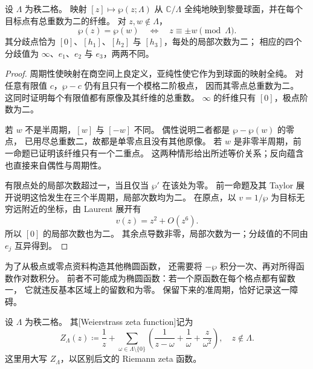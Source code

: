 \begin{proposition}[二重映射的纤维与分歧]\label{b3:prop:22-wp-fibers}
设 \(\Lambda\) 为秩二格。
映射 \([z]\mapsto\wp(z;\Lambda)\) 从 \(\mathbb C/\Lambda\)
全纯地映到黎曼球面，并在每个目标点有总重数为二的纤维。
对 \(z,w\notin\Lambda\)，
\[
 \wp(z)=\wp(w)
 \quad\Longleftrightarrow\quad z\equiv\pm w\pmod\Lambda.
\]
其分歧点恰为 \([0]\)、\([h_1]\)、\([h_2]\) 与 \([h_3]\)，每处的局部次数为二；
相应的四个分歧值为 \(\infty\)、\(e_1\)、\(e_2\) 与 \(e_3\)，两两不同。
\end{proposition}
\begin{proof}
周期性使映射在商空间上良定义，亚纯性使它作为到球面的映射全纯。
对任意有限值 \(c\)，\(\wp-c\) 仍有且只有一个模格二阶极点，
因而其零点总重数为二。
这同时证明每个有限值都有原像及其纤维的总重数。
\(\infty\) 的纤维只有 \([0]\)，极点阶数为二。

若 \(w\) 不是半周期，\([w]\) 与 \([-w]\) 不同。
偶性说明二者都是 \(\wp-\wp(w)\) 的零点，
已用尽总重数二，故都是单零点且没有其他原像。
若 \(w\) 是非零半周期，前一命题已证明该纤维只有一个二重点。
这两种情形给出所述等价关系；反向蕴含也直接来自偶性与周期性。

有限点处的局部次数超过一，当且仅当 \(\wp'\) 在该处为零。
前一命题及其 Taylor 展开说明这恰发生在三个半周期，局部次数均为二。
在原点，以 \(v=1/\wp\) 为目标无穷远附近的坐标，由 Laurent 展开有
\[
 v(z)=z^2+O(z^6).
\]
所以 \([0]\) 的局部次数也为二。
其余点导数非零，局部次数为一；分歧值的不同由 \(e_j\) 互异得到。
\end{proof}

为了从极点或零点资料构造其他椭圆函数，
还需要将 \(-\wp\) 积分一次、再对所得函数作对数积分。
前者不可能成为椭圆函数：若一个原函数在每个格点都有留数一，
它就违反基本区域上的留数和为零。
保留下来的准周期，恰好记录这一障碍。

\begin{definition}\label{b3:def:22-zeta}
设 \(\Lambda\) 为秩二格。
其[Weierstrass zeta function]记为
\[
 Z_\Lambda(z)\coloneqq\frac1z+
 \sum_{\omega\in\Lambda\setminus\{0\}}
 \left(\frac1{z-\omega}+\frac1\omega+\frac z{\omega^2}\right),
 \quad z\notin\Lambda.
\]
这里用大写 \(Z_\Lambda\)，以区别后文的 Riemann zeta 函数。
\end{definition}

